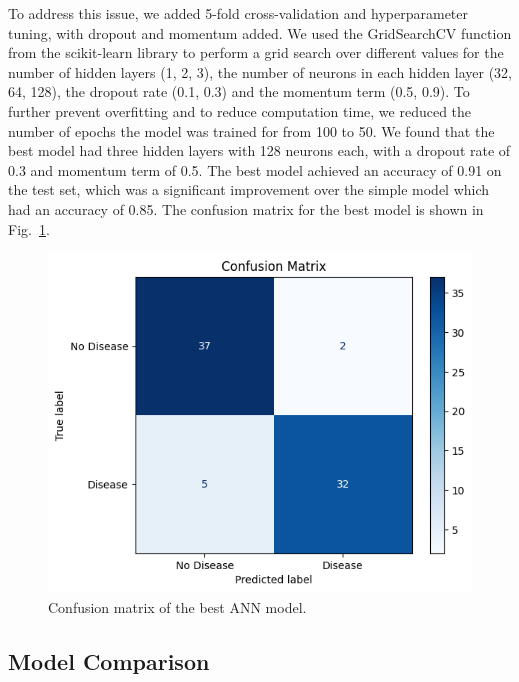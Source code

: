 To address this issue, we added 5-fold cross-validation and hyperparameter tuning, with dropout and momentum added. We used the GridSearchCV function from the scikit-learn library to perform a grid search over different values for the number of hidden layers (1, 2, 3), the number of neurons in each hidden layer (32, 64, 128), the dropout rate (0.1, 0.3) and the momentum term (0.5, 0.9). To further prevent overfitting and to reduce computation time, we reduced the number of epochs the model was trained for from 100 to 50. We found that the best model had three hidden layers with 128 neurons each, with a dropout rate of 0.3 and momentum term of 0.5. The best model achieved an accuracy of 0.91 on the test set, which was a significant improvement over the simple model which had an accuracy of 0.85. The confusion matrix for the best model is shown in Fig.~\ref{annconfusion}.

\begin{figure}[htbp]
    \centerline{\includegraphics[width=0.7\columnwidth]{img/annconfusion.png}}
    \caption{Confusion matrix of the best ANN model.}\label{annconfusion}
\end{figure}

\subsection{Model Comparison}